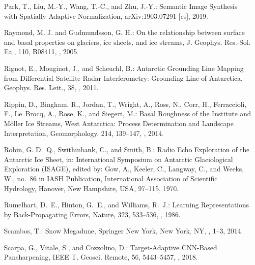 \documentclass[tc, noline]{copernicus}
\begin{document}
\begin{thebibliography}{95}
Park, T., Liu, M.-Y., Wang, T.-C., and Zhu, J.-Y.:
Semantic Image Synthesis with Spatially-Adaptive Normalization,
arXiv:1903.07291 [cs], 2019.


Raymond, M. J. and Gudmundsson, G. H.: On the relationship between surface and basal properties on glaciers, ice sheets, and ice streams, J. Geophys. Res.-Sol. Ea., 110, B08411, , 2005.

Rignot, E., Mouginot, J., and Scheuchl, B.:
Antarctic Grounding Line Mapping from Differential Satellite Radar Interferometry: Grounding Line of Antarctica,
Geophys. Res. Lett.,
38, , 2011.

Rippin, D., Bingham, R., Jordan, T., Wright, A., Ross, N., Corr, H., Ferraccioli, F., Le~Brocq, A., Rose, K., and Siegert, M.:
Basal Roughness of the Institute and M\"oller Ice Streams, West Antarctica: Process Determination and Landscape Interpretation,
Geomorphology,
214, 139--147, , 2014.

Robin, G. D.~Q., Swithinbank, C., and Smith, B.:
Radio Echo Exploration of the Antarctic Ice Sheet,
in: International Symposium on Antarctic Glaciological Exploration (ISAGE),
edited by: Gow, A., Keeler, C., Langway, C., and Weeks, W.,
no.~86 in IASH Publication,
International Association of Scientific Hydrology, Hanover, New Hampshire, USA, 97--115, 1970.

Rumelhart, D.~E., Hinton, G.~E., and Williams, R.~J.:
Learning Representations by Back-Propagating Errors,
Nature,
323, 533--536, , 1986.


Scambos, T.:
Snow Megadune,
Springer New York, New York, NY, , 1--3, 2014.

Scarpa, G., Vitale, S., and Cozzolino, D.:
Target-Adaptive CNN-Based Pansharpening,
IEEE T. Geosci. Remote,
56, 5443--5457, , 2018.


\end{thebibliography}
\end{document}
